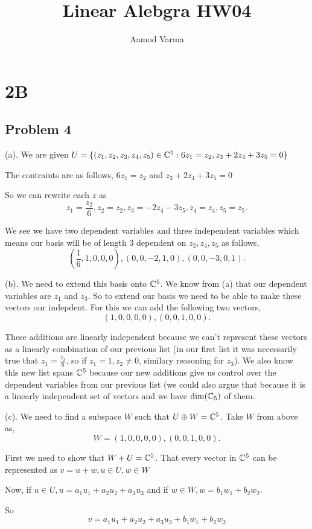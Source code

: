 \documentclass[a4paper]{report}
\title{Linear Alebgra HW04}
\author{Aamod Varma}
\begin{document}
\maketitle
\date{}


\section*{2B}
\subsection*{Problem 4}
(a). We are given $U = \{(z_1,z_2,z_3,z_4,z_5) \in \mathbb{C}^5 : 6z_1 =z_2, z_3+2z_4+3z_5=0\}$

The contraints are as follows, $6z_1 = z_2$ and $z_3+2z_4+3z_5=0$

So we can rewrite each $z$ as  \[
z_1 = \frac{z_2}{6}, z_2=z_2, z_3=-2z_4-3z_5, z_4=z_4,z_5=z_5
.\] 

We see we have two dependent variables and three independent variables which means our basis will be of length $3$ dependent on $z_2,z_4,z_5$ as follows, \[
    (\frac{1}{6}, 1,0,0,0), (0,0,-2,1,0), (0,0,-3,0,1)
.\] 

(b). We need to extend this basis onto $\mathbb{C}^5$. We know from (a) that our dependent variables are  $z_1$ and $z_3$. So to extend our basis we need to be able to make these vectors our indepdent. For this we can add the following two vectors, \[
    (1,0,0,0,0), (0,0,1,0,0)
.\] 

These additions are linearly independent because we can't represent these vectors as a linearly combination of our previous list (in our first list it was necessarily true that $z_1 = \frac{z_2}{6}$, so if $z_1=1, z_2\neq 0$, similary reasoning for $z_3$). We also know this new list spans $\mathbb{C}^5$ because our new additions give us control over the dependent variables from our previous list (we could also argue that because it is a linearly independent set of vectors and we have  $\dim(\mathbb{C}_5)$ of them.


(c). We need to find a subspace $W$ such that  $U \oplus W = \mathbb{C}^5$. Take  $W$ from above as,  \[
    W = {(1,0,0,0,0),(0,0,1,0,0)}
.\] 

First we need to show that $W + U =\mathbb{C}^5$.  That every vector in $\mathbb{C}^5$ can be represented as $v = u + w, u \in U, w \in W$ 

Now, if $u \in U, u = a_1u_1+a_2u_2 + a_3u_3$ and if $w \in W, w = b_1w_1+b_2w_2$. 

So $$v = a_1u_1+a_2u_2+a_3u_3 + b_{1}w_1+b_2w_2$$
\end{document}
